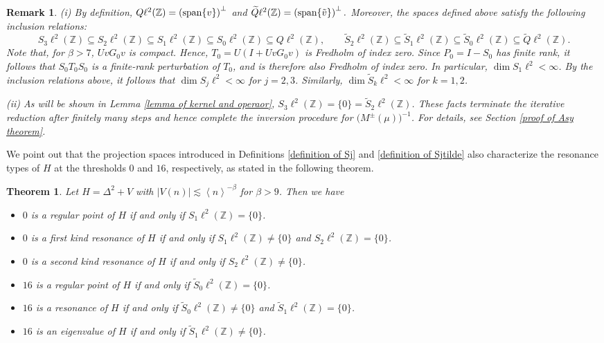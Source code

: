 \documentclass[reqno, 11pt]{amsart}
\newtheorem{theorem}[definition]{Theorem}
\newtheorem{remark}[definition]{Remark}
\newcommand\Z{\mathbb{Z}}
\numberwithin{equation}{section}
\begin{document}
\begin{remark} {\rm (i) By definition,
$Q\ell^2(\Z)=\left({\rm span}\{v\}\right)^{\bot}$ and $\widetilde{Q}\ell^2(\Z)=\left({\rm span}\{\tilde{v}\}\right)^{\bot}.$
Moreover, the spaces defined above satisfy the following inclusion relations:
\begin{equation*}
S_3\ell^2(\Z)\subseteq S_2\ell^2(\Z)\subseteq S_1\ell^2(\Z)\subseteq S_0\ell^2(\Z)\subseteq Q\ell^2(\Z),\qquad\widetilde{S}_2\ell^2(\Z)\subseteq\widetilde{S}_1\ell^2(\Z)\subseteq \widetilde{S}_0\ell^2(\Z) \subseteq \widetilde{Q}\ell^2(\Z).
\end{equation*}
Note that, for $\beta>7$, $UvG_0v$ is compact. Hence, $T_0=U(I+UvG_0v)$ is Fredholm of index zero. Since $P_0=I-S_0$ has finite rank, it follows that $S_0T_0S_0$
is a finite-rank perturbation of $T_0$, and is therefore also Fredholm of index zero. In particular, $\dim S_1\ell^2<\infty$. By the inclusion relations above, it follows that $\dim S_j\ell^2<\infty$ for $j=2,3$. Similarly, $\dim \widetilde{S}_k\ell^2<\infty$ for $k=1,2$.

(ii) As will be shown in Lemma \ref{lemma of kernel and operaor}, $S_3\ell^2(\Z)=\{0\}=\widetilde{S}_2\ell^2(\Z)$. These facts terminate the iterative reduction after finitely many steps and hence complete the inversion procedure for $\bigl(M^\pm(\mu)\bigr)^{-1}$. For details, see Section \ref{proof of Asy theorem}.
}
\end{remark}
We point out that the projection spaces introduced in Definitions \ref{definition of Sj} and \ref{definition of Sjtilde} also characterize the resonance types of $H$ at the thresholds $0$ and $16$, respectively, as stated in the following theorem.
\begin{theorem}\label{relation space and resonance types}
 Let $H=\Delta^2+V$ with $|V(n)|\lesssim \left<n\right>^{-\beta}$ for $\beta>9$. Then we have
\begin{itemize}
\item[{\rm(i)}] $0$ is a regular point of $H$ if and only if $S_1\ell^2(\Z)=\{0\}$.
\item[{\rm(ii)}] $0$ is a first kind resonance of $H$ if and only if $S_1\ell^2(\Z)\neq\{0\}$ and $S_2\ell^2(\Z)=\{0\}$.
\item[{\rm(iii)}] $0$ is a second kind resonance of $H$ if and only if $S_2\ell^2(\Z)\neq\{0\}$.

\item[{\rm(iv)}] $16$ is a regular point of $H$ if and only if $\widetilde{S}_0\ell^2(\Z)=\{0\}$.
\item[{\rm(v)}] $16$ is a resonance of $H$ if and only if $\widetilde{S}_0\ell^2(\Z)\neq\{0\}$ and $\widetilde{S}_{1}\ell^2(\Z)=\{0\}$.
\item[{\rm(vi)}] $16$ is an eigenvalue of $H$ if and only if $\widetilde{S}_{1}\ell^2(\Z)\neq\{0\}$.
\end{itemize}
\end{theorem}
\end{document}
